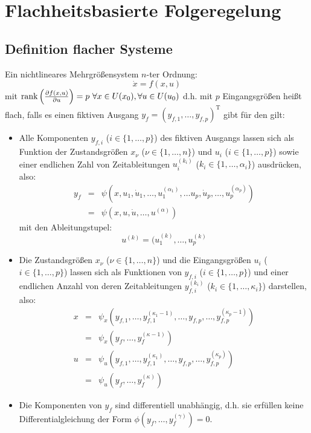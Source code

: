 \chapter{Flachheitsbasierte Folgeregelung}
\section{Definition flacher Systeme}
Ein nichtlineares Mehrgrößensystem $n$-ter Ordnung:
\begin{equation}
    \dot{x} = f(x,u)
\end{equation}
mit $\operatorname*{rank}\left(\frac{\partial f(x,u)}{\partial u}\right) = p\ \forall x \in U(x_0), \forall
u \in U(u_0)$ d.h. mit $p$ Eingangsgrößen heißt flach, falls es einen fiktiven
Ausgang $y_f = {(y_{f,1}, \ldots, y_{f,p})}^\text{T}$ gibt für den gilt:
\begin{itemize}
    \item
        Alle Komponenten $y_{f,i}$ ($i \in \{1, \ldots, p\}$) des fiktiven Ausgangs
        lassen sich als Funktion der Zustandsgrößen $x_\nu$ ($\nu \in \{1, \ldots, n\}$)
        und $u_i$ ($i \in \{1, \ldots, p\}$) sowie einer endlichen Zahl von Zeitableitungen
        $u_i^{(k_i)}$ ($k_i \in \{1, \ldots, \alpha_i\}$) ausdrücken, also:        
        \begin{eqnarray}
            y_f &=& \psi(x, u_1, \dot{u}_1, \ldots, u_1^{(\alpha_1)}, \ldots
                u_p, \dot{u}_p, \ldots, u_p^{(\alpha_p)}) \\
                &=& \psi(x, u, \dot{u}, \ldots, u^{(\alpha)})
        \end{eqnarray}
        mit den Ableitungstupel:
        \begin{equation}
            u^{(k)} = (u_1^{(k)}, \ldots, u_p^{(k)}
        \end{equation}
    \item  
        Die Zustandsgrößen $x_\nu$ ($\nu \in \{1, \ldots, n\}$) und die Eingangsgrößen
        $u_i$ ($i \in \{1, \ldots, p\}$) lassen sich als Funktionen von $y_{f,i}$
        ($i \in \{1, \ldots, p\}$) und einer endlichen Anzahl von deren Zeitableitungen
        $y_{f,i}^{(k_i)}$ ($k_i \in \{1, \ldots, \kappa_i\}$) darstellen, also:
        \begin{eqnarray}
            x &=& \psi_x (y_{f,1}, \ldots, y_{f,1}^{(\kappa_1 - 1)}, \ldots,
                y_{f, p}, \ldots, y_{f, p}^{(\kappa_p -1)}) \\
                &=& \psi_x(y_f, \ldots, y_f^{(\kappa-1)}) \\
            u &=& \psi_u (y_{f,1}, \ldots, y_{f,1}^{(\kappa_1)}, \ldots,
                y_{f, p}, \ldots, y_{f, p}^{(\kappa_p)}) \\
                &=& \psi_u(y_f, \ldots, y_f^{(\kappa)})
        \end{eqnarray} 
    \item Die Komponenten von $y_f$ sind differentiell unabhängig, d.h. sie erfüllen keine
        Differentialgleichung der Form $\phi(y_f, \ldots, y_f^{(\gamma)}) = 0$.
\end{itemize}

